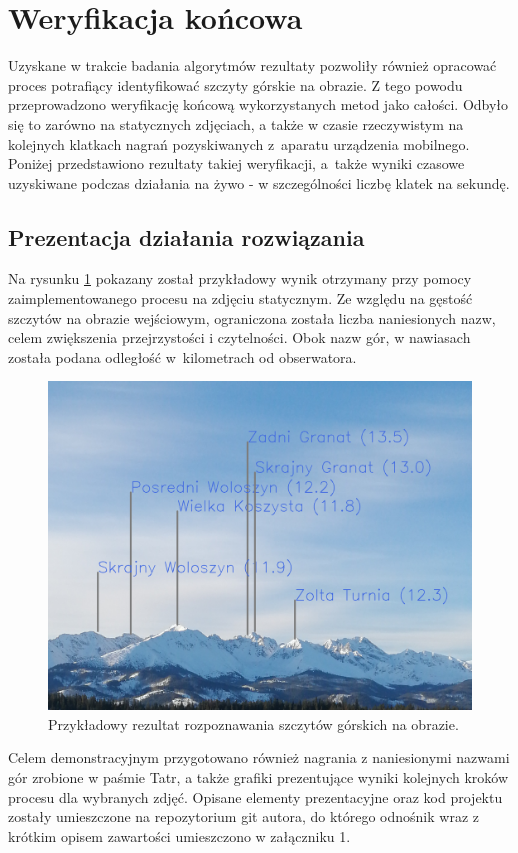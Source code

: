 \newpage

\section{Weryfikacja końcowa} \label{sec:weryfikacja_koncowa}

Uzyskane w trakcie badania algorytmów rezultaty pozwoliły również opracować proces potrafiący identyfikować szczyty górskie na obrazie. Z tego powodu przeprowadzono weryfikację końcową wykorzystanych metod jako całości. Odbyło się to zarówno na statycznych zdjęciach, a także w czasie rzeczywistym na kolejnych klatkach nagrań pozyskiwanych z~aparatu urządzenia mobilnego. Poniżej przedstawiono rezultaty takiej weryfikacji, a~także wyniki czasowe uzyskiwane podczas działania na żywo - w szczególności liczbę klatek na sekundę.

\subsection{Prezentacja działania rozwiązania}

Na rysunku \ref{fig:real_annotated} pokazany został przykładowy wynik otrzymany przy pomocy zaimplementowanego procesu na zdjęciu statycznym. Ze względu na gęstość szczytów na obrazie wejściowym, ograniczona została liczba naniesionych nazw, celem zwiększenia przejrzystości i czytelności. Obok nazw gór, w nawiasach została podana odległość w~kilometrach od obserwatora. 

\begin{figure}[!h]
    \centering \includegraphics[width=0.65\linewidth]{img/real_annotated.png}
    \caption{Przykładowy rezultat rozpoznawania szczytów górskich na obrazie.}
    \label{fig:real_annotated}
\end{figure}


Celem demonstracyjnym przygotowano również nagrania z naniesionymi nazwami gór zrobione w paśmie Tatr, a także grafiki prezentujące wyniki kolejnych kroków procesu dla wybranych zdjęć. Opisane elementy prezentacyjne oraz kod projektu zostały umieszczone na repozytorium git autora, do którego odnośnik wraz z krótkim opisem zawartości umieszczono w załączniku 1.

